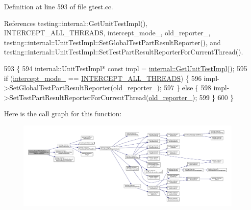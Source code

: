 Definition at line 593 of file gtest.\+cc.



References testing\+::internal\+::\+Get\+Unit\+Test\+Impl(), I\+N\+T\+E\+R\+C\+E\+P\+T\+\_\+\+A\+L\+L\+\_\+\+T\+H\+R\+E\+A\+DS, intercept\+\_\+mode\+\_\+, old\+\_\+reporter\+\_\+, testing\+::internal\+::\+Unit\+Test\+Impl\+::\+Set\+Global\+Test\+Part\+Result\+Reporter(), and testing\+::internal\+::\+Unit\+Test\+Impl\+::\+Set\+Test\+Part\+Result\+Reporter\+For\+Current\+Thread().


\begin{DoxyCode}
593                                                                     \{
594   internal::UnitTestImpl* \textcolor{keyword}{const} impl = \hyperlink{namespacetesting_1_1internal_a9bd0caf5d16512de38b39599c13ee634}{internal::GetUnitTestImpl}();
595   \textcolor{keywordflow}{if} (\hyperlink{classtesting_1_1ScopedFakeTestPartResultReporter_ae62ed825619c11ac21fdd06480e0d982}{intercept\_mode\_} == \hyperlink{classtesting_1_1ScopedFakeTestPartResultReporter_a82f6209b3cf5c4b15ec8bd8041dbc2d5a187f4164aad7fbb9414b263c68a693cd}{INTERCEPT\_ALL\_THREADS}) \{
596     impl->SetGlobalTestPartResultReporter(\hyperlink{classtesting_1_1ScopedFakeTestPartResultReporter_a4183b091842a83dd8ce4927746c43092}{old\_reporter\_});
597   \} \textcolor{keywordflow}{else} \{
598     impl->SetTestPartResultReporterForCurrentThread(\hyperlink{classtesting_1_1ScopedFakeTestPartResultReporter_a4183b091842a83dd8ce4927746c43092}{old\_reporter\_});
599   \}
600 \}
\end{DoxyCode}
Here is the call graph for this function\+:
\nopagebreak
\begin{figure}[H]
\begin{center}
\leavevmode
\includegraphics[width=350pt]{classtesting_1_1ScopedFakeTestPartResultReporter_a4817d59ca70228ebd5d5c3c4e8dd729d_cgraph}
\end{center}
\end{figure}


